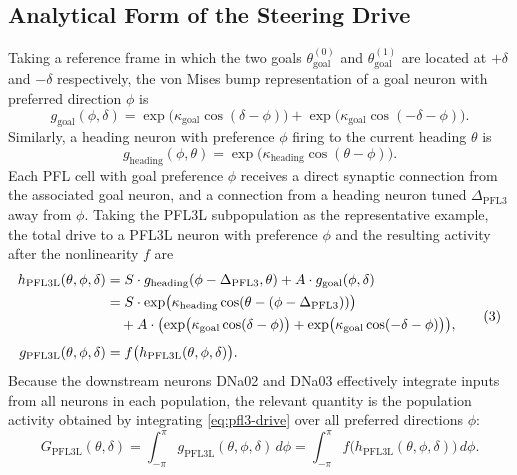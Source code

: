 \documentclass[11pt, a4paper]{article}
\newcommand{\kh}{\kappa_{\mathrm{heading}}}
\newcommand{\kg}{\kappa_{\mathrm{goal}}}
\newcommand{\Dp}{\Delta_{\mathrm{PFL3}}}
\begin{document}
\subsection{Analytical Form of the Steering Drive}
\label{sec:bessel}

Taking a reference frame in which the two goals
$\theta_{\mathrm{goal}}^{(0)}$ and $\theta_{\mathrm{goal}}^{(1)}$ are located
at $+\delta$ and $-\delta$ respectively, the von Mises bump representation of a
goal neuron with preferred direction $\phi$ is
%
\begin{equation}
\label{eq:goal-bump}
g_{\mathrm{goal}}(\phi, \delta)
  = \exp\bigl(\kg\cos(\delta - \phi)\bigr)
  + \exp\bigl(\kg\cos(-\delta - \phi)\bigr).
\tag{1}
\end{equation}
%
Similarly, a heading neuron with preference $\phi$ firing to the current heading
$\theta$ is
%
\begin{equation}
\label{eq:heading-bump}
g_{\mathrm{heading}}(\phi, \theta)
  = \exp\bigl(\kh\cos(\theta - \phi)\bigr).
\tag{2}
\end{equation}
%
Each PFL cell with goal preference $\phi$ receives a direct synaptic connection
from the associated goal neuron, and a connection from a heading neuron tuned
$\Dp$ away from $\phi$.  Taking the PFL3L subpopulation as the representative
example, the total drive to a PFL3L neuron with preference $\phi$ and the
resulting activity after the nonlinearity $f$ are
%
\begin{equation}
\label{eq:pfl3-drive}
\begin{aligned}
h_{\mathrm{PFL3L}}(\theta, \phi, \delta)
  &= S \cdot g_{\mathrm{heading}}(\phi - \Dp, \theta)
   + A \cdot g_{\mathrm{goal}}(\phi, \delta) \\
  &= S \cdot \exp\bigl(\kh\cos(\theta - (\phi - \Dp))\bigr) \notag\\
   &\quad+ A \cdot \bigl(
       \exp\bigl(\kg\cos(\delta - \phi)\bigr)
     + \exp\bigl(\kg\cos(-\delta - \phi)\bigr)
   \bigr), \\[4pt]
g_{\mathrm{PFL3L}}(\theta, \phi, \delta)
  &= f\bigl(h_{\mathrm{PFL3L}}(\theta, \phi, \delta)\bigr).
\end{aligned}
\tag{3}
\end{equation}
%
Because the downstream neurons DNa02 and DNa03 effectively integrate inputs
from all neurons in each population, the relevant quantity is the population
activity obtained by integrating \cref{eq:pfl3-drive} over all preferred
directions $\phi$:
%
\begin{equation}
\label{eq:pop-activity}
G_{\mathrm{PFL3L}}(\theta, \delta)
  = \int_{-\pi}^{\pi} g_{\mathrm{PFL3L}}(\theta, \phi, \delta)\,d\phi
  = \int_{-\pi}^{\pi} f\bigl(h_{\mathrm{PFL3L}}(\theta, \phi, \delta)\bigr)\,d\phi.
\tag{4}
\end{equation}
\end{document}
